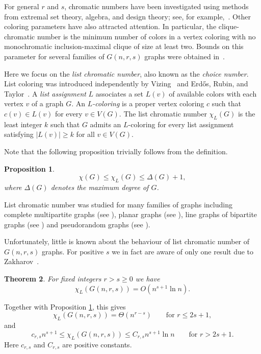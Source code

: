 \documentclass[12pt]{article}
\newtheorem{theorem}{Theorem}
\newtheorem{proposition}[theorem]{Proposition}
\theoremstyle{remark}
\theoremstyle{definition}
\begin{document}
For general $r$ and $s$, chromatic numbers have been investigated using methods from extremal set theory, algebra, and design theory; see, for example,~\cite{RaiMetaAlphaChrom,FrW,ZChrom}.
Other coloring parameters have also attracted attention. In particular, the clique-chromatic number is the minimum number of colors in a vertex coloring with no monochromatic inclusion-maximal clique of size at least two. Bounds on this parameter for several families of $G(n,r,s)$ graphs were obtained in~\cite{Rai1,DAM,ClChr2}.

Here we focus on the \emph{list chromatic number}, also known as the \emph{choice number}. List coloring was introduced independently by Vizing~\cite{Vizing1976} and Erd\H{o}s, Rubin, and Taylor~\cite{ERT1980}. A \emph{list assignment} $L$ associates a set $L(v)$ of available colors with each vertex $v$ of a graph $G$. An \emph{$L$-coloring} is a proper vertex coloring $c$ such that $c(v)\in L(v)$ for every $v\in V(G)$. The list chromatic number $\chi_L(G)$ is the least integer $k$ such that $G$ admits an $L$-coloring for every list assignment satisfying $|L(v)|\ge k$ for all $v\in V(G)$. 

Note that the following proposition trivially follows from the definition.

\begin{proposition}\label{trivial}
$$
\chi(G)\le\chi_L(G)\le\Delta(G)+1,
$$
where $\Delta(G)$ denotes the maximum degree of $G$.
\end{proposition}

List chromatic number was studied for many families of graphs including complete multipartite graphs (see \cite{Alon1992, Shabanov2011}), planar graphs (see \cite{Thomassen1994}), line graphs of bipartite graphs (see \cite{Galvin1995}) and pseudorandom graphs (see \cite{SpLChr}).

Unfortunately, little is known about the behaviour of list chromatic number of $G(n,r,s)$ graphs. For positive $s$ we in fact are aware of only one result due to  Zakharov~\cite{ZChrom}.

\begin{theorem}
    \label{Zakharov}
    For fixed integers $r > s \geq 0$ we have
    $$
    \chi_L(G(n,r,s))=O(n^{s+1}\ln n).
    $$
\end{theorem}

Together with Proposition \ref{trivial}, this gives
$$
\chi_L(G(n,r,s))=\Theta(n^{r-s})
\qquad\text{for }r\leq2s+1,
$$
and
$$
c_{r,s}n^{s+1}\leq\chi_L(G(n,r,s))
\leq C_{r,s}n^{s+1}\ln n \qquad\text{for }r > 2s+1.
$$
Here $c_{r,s}$ and $C_{r,s}$ are positive constants.
\end{document}

